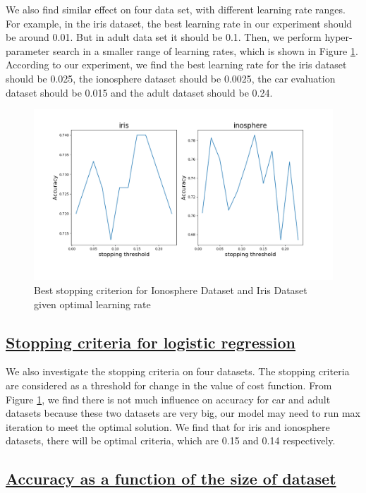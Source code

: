 \documentclass[11pt]{scrartcl}
\begin{document}
We also find similar effect on four data set, with different learning rate ranges. For example, in the iris dataset, the best learning rate in our experiment should be around 0.01. But in adult data set it should be 0.1. Then, we perform hyper-parameter search in a smaller range of learning rates, which is shown in Figure \ref{stopping_cri_lr}. According to our experiment, we find the best learning rate for the iris dataset should be 0.025, the ionosphere dataset should be 0.0025, the car evaluation dataset should be 0.015 and the adult dataset should be 0.24.

\begin{figure}[H]
	\centering
	\includegraphics[width=0.68\linewidth]{fig/stopping-threshold.png}
	\caption{Best stopping criterion for Ionosphere Dataset and Iris Dataset given optimal learning rate}
	\label{stopping_cri_lr}
\end{figure}

\subsection*{\underline{Stopping criteria for logistic regression}}

We also investigate the stopping criteria on four datasets. The stopping criteria are considered as a threshold for change in the value of cost function. From Figure \ref{stopping_cri_lr}, we find there is not much influence on accuracy for car and adult datasets because these two datasets are very big, our model may need to run max iteration to meet the optimal solution. We find that for iris and ionosphere datasets, there will be optimal criteria, which are 0.15 and 0.14 respectively.



\subsection*{\underline{Accuracy as a function of the size of dataset}}
\end{document}
